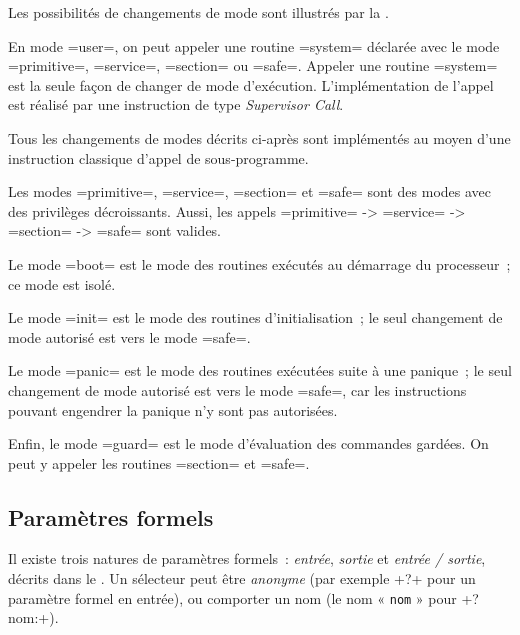 Les possibilités de changements de mode sont illustrés par la .

En mode \plm=user=, on peut appeler une routine \plm=system= déclarée avec le mode \plm=primitive=, \plm=service=, \plm=section= ou \plm=safe=. Appeler une routine \plm=system= est la seule façon de changer de mode d'exécution. L'implémentation de l'appel est réalisé par une instruction de type \emph{Supervisor Call}.

Tous les changements de modes décrits ci-après sont implémentés au moyen d'une instruction classique d'appel de sous-programme.

Les modes \plm=primitive=, \plm=service=, \plm=section= et \plm=safe= sont des modes avec des privilèges décroissants. Aussi, les appels \plm=primitive= -> \plm=service= -> \plm=section= -> \plm=safe= sont valides.

Le mode \plm=boot= est le mode des routines exécutés au démarrage du processeur~; ce mode est isolé.

Le mode \plm=init= est le mode des routines d'initialisation~; le seul changement de mode autorisé est vers le mode \plm=safe=. 

Le mode \plm=panic= est le mode des routines exécutées suite à une panique~; le seul changement de mode autorisé est vers le mode \plm=safe=, car les instructions pouvant engendrer la panique n'y sont pas autorisées. 

Enfin, le mode \plm=guard= est le mode d'évaluation des commandes gardées. On peut y appeler les routines \plm=section= et \plm=safe=.












\subsection{Paramètres formels}

Il existe trois natures de paramètres formels~: \emph{entrée}, \emph{sortie} et \emph{entrée / sortie}, décrits dans le . Un sélecteur peut être \emph{anonyme} (par exemple \plm+?+ pour un paramètre formel en entrée), ou comporter un nom (le nom « \texttt{nom} » pour \plm+?nom:+).

